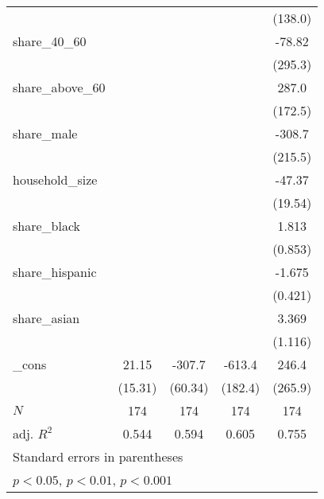 {\begin{tabular}{l*{4}{c}}
            &                     &                     &                     &     (138.0)         \\
[1em]
share\_40\_60 &                     &                     &                     &      -78.82         \\
            &                     &                     &                     &     (295.3)         \\
[1em]
share\_above\_60&                     &                     &                     &       287.0         \\
            &                     &                     &                     &     (172.5)         \\
[1em]
share\_male  &                     &                     &                     &      -308.7         \\
            &                     &                     &                     &     (215.5)         \\
[1em]
household\_size&                     &                     &                     &      -47.37\sym{*}  \\
            &                     &                     &                     &     (19.54)         \\
[1em]
share\_black &                     &                     &                     &       1.813\sym{*}  \\
            &                     &                     &                     &     (0.853)         \\
[1em]
share\_hispanic&                     &                     &                     &      -1.675\sym{***}\\
            &                     &                     &                     &     (0.421)         \\
[1em]
share\_asian &                     &                     &                     &       3.369\sym{**} \\
            &                     &                     &                     &     (1.116)         \\
[1em]
\_cons      &       21.15         &      -307.7\sym{***}&      -613.4\sym{***}&       246.4         \\
            &     (15.31)         &     (60.34)         &     (182.4)         &     (265.9)         \\
\hline
\(N\)       &         174         &         174         &         174         &         174         \\
adj. \(R^{2}\)&       0.544         &       0.594         &       0.605         &       0.755         \\
\hline\hline
\multicolumn{5}{l}{\footnotesize Standard errors in parentheses}\\
\multicolumn{5}{l}{\footnotesize \sym{*} \(p<0.05\), \sym{**} \(p<0.01\), \sym{***} \(p<0.001\)}\\
\end{tabular}
}
